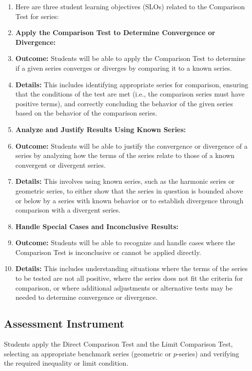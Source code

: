 \begin{enumerate}
    \item Here are three student learning objectives (SLOs) related to the Comparison Test for series:
    \item \textbf{Apply the Comparison Test to Determine Convergence or Divergence:}
    \item \textbf{Outcome:} Students will be able to apply the Comparison Test to determine if a given series converges or diverges by comparing it to a known series.
    \item \textbf{Details:} This includes identifying appropriate series for comparison, ensuring that the conditions of the test are met (i.e., the comparison series must have positive terms), and correctly concluding the behavior of the given series based on the behavior of the comparison series.
    \item \textbf{Analyze and Justify Results Using Known Series:}
    \item \textbf{Outcome:} Students will be able to justify the convergence or divergence of a series by analyzing how the terms of the series relate to those of a known convergent or divergent series.
    \item \textbf{Details:} This involves using known series, such as the harmonic series or geometric series, to either show that the series in question is bounded above or below by a series with known behavior or to establish divergence through comparison with a divergent series.
    \item \textbf{Handle Special Cases and Inconclusive Results:}
    \item \textbf{Outcome:} Students will be able to recognize and handle cases where the Comparison Test is inconclusive or cannot be applied directly.
    \item \textbf{Details:} This includes understanding situations where the terms of the series to be tested are not all positive, where the series does not fit the criteria for comparison, or where additional adjustments or alternative tests may be needed to determine convergence or divergence.
\end{enumerate}

\subsection{Assessment Instrument}
\label{ssec:comp-6dff}

Students apply the Direct Comparison Test and the Limit Comparison Test, selecting an appropriate benchmark series (geometric or $p$-series) and verifying the required inequality or limit condition.

